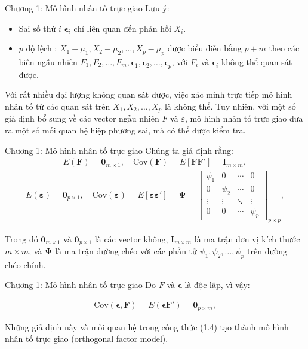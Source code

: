 \begin{frame}{Chương 1: Mô hình nhân tố trực giao}
Lưu ý: 
\begin{itemize}
    \item Sai số thứ \(i\) \(\boldsymbol{\epsilon}_i\) chỉ liên quan đến phản hồi \(X_i\).
    \item \(p\) độ lệch : \(X_1 - \mu_1, X_2 - \mu_2, \ldots, X_p - \mu_p\) được biểu diễn bằng \(p + m\) theo các biến ngẫu nhiên  \(F_1, F_2, \ldots, F_m, \boldsymbol{\epsilon}_1, \boldsymbol{\epsilon}_2, \ldots, \boldsymbol{\epsilon}_p\), với \(F_i\) và \(\boldsymbol{\epsilon}_i\) không thể quan sát được.
\end{itemize}

Với rất nhiều đại lượng không quan sát được, việc xác minh trực tiếp mô hình nhân tố từ các quan sát trên \(X_1, X_2, \ldots, X_p\) là không thể. Tuy nhiên, với một số giả định bổ sung về các vector ngẫu nhiên \(F\) và \(\varepsilon\), mô hình nhân tố trực giao đưa ra một số mối quan hệ hiệp phương sai, mà có thể được kiểm tra.
\end{frame}

\begin{frame}{Chương 1: Mô hình nhân tố trực giao}
Chúng ta giả định rằng:
\begin{eqnarray}
E(\mathbf{F}) = \mathbf{0}_{m \times 1}, \quad \text{Cov}(\mathbf{F}) = E[\mathbf{FF}'] = \mathbf{I}_{m \times m},
\end{eqnarray}
\begin{eqnarray}
E(\boldsymbol{\varepsilon}) = \mathbf{0}_{p \times 1}, \quad \text{Cov}(\boldsymbol{\varepsilon}) = E[\boldsymbol{\varepsilon} \boldsymbol{\varepsilon}'] = \boldsymbol{\Psi} =
\begin{bmatrix}
\psi_1 & 0 & \cdots & 0 \\
0 & \psi_2 & \cdots & 0 \\
\vdots & \vdots & \ddots & \vdots \\
0 & 0 & \cdots & \psi_p
\end{bmatrix}_{p \times p},
\end{eqnarray}

Trong đó \(\mathbf{0}_{m \times 1}\) và \(\mathbf{0}_{p \times 1}\) là các vector không, \(\mathbf{I}_{m \times m}\) là ma trận đơn vị kích thước \(m \times m\), và \(\boldsymbol{\Psi}\) là ma trận đường chéo với các phần tử \(\psi_1, \psi_2, \ldots, \psi_p\) trên đường chéo chính.
\end{frame}

\begin{frame}{Chương 1: Mô hình nhân tố trực giao}
Do \(F\) và \(\boldsymbol{\epsilon}\) là độc lập, vì vậy:

\begin{eqnarray}
\text{Cov}(\boldsymbol{\epsilon}, \mathbf{F}) = E(\boldsymbol{\epsilon}\mathbf{F}') = \mathbf{0}_{p \times m},
\end{eqnarray}

Những giả định này và mối quan hệ trong công thức (1.4) tạo thành mô hình nhân tố trực giao (orthogonal factor model).
\end{frame}
